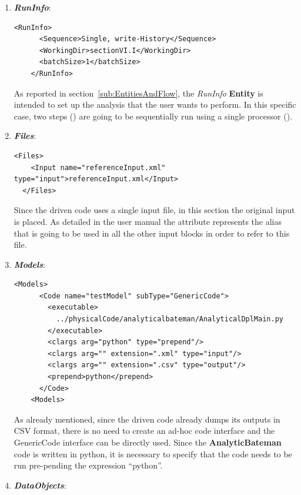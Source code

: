  \begin{enumerate}
   \item \textbf{\textit{RunInfo}}:
\begin{lstlisting}[style=XML,morekeywords={arg,extension,pauseAtEnd,overwrite}]
    <RunInfo>
      <Sequence>Single, write-History</Sequence>
      <WorkingDir>sectionVI.I</WorkingDir>
      <batchSize>1</batchSize>
    </RunInfo>   
\end{lstlisting}   
   As reported in section~\ref{sub:EntitiesAndFlow}, the \textit{RunInfo} \textbf{Entity} is intended to set up the analysis 
   that the user wants to perform. In this specific case, two steps () are going to be sequentially run 
   using a single processor ().
   
   \item \textbf{\textit{Files}}:
\begin{lstlisting}[style=XML,morekeywords={arg,extension,pauseAtEnd,overwrite}]
  <Files>
    <Input name="referenceInput.xml" type="input">referenceInput.xml</Input>
  </Files>
\end{lstlisting}
   Since the driven code uses a single input file, in this section the original input is placed. As detailed in the user manual
   the attribute   represents the alias that is going to be used in all the other input blocks in order to 
   refer to this file.
   \item \textbf{\textit{Models}}:
\begin{lstlisting}[style=XML,morekeywords={arg,extension,pauseAtEnd,overwrite}]
   <Models>
      <Code name="testModel" subType="GenericCode">
        <executable>
          ../physicalCode/analyticalbateman/AnalyticalDplMain.py
        </executable>
        <clargs arg="python" type="prepend"/>
        <clargs arg="" extension=".xml" type="input"/>
        <clargs arg="" extension=".csv" type="output"/>
        <prepend>python</prepend>
      </Code>
    <Models>
\end{lstlisting}
  As already mentioned, since the driven code already dumps its outputs in CSV format, there is no need to create
  an ad-hoc code interface and the GenericCode interface can be directly used. Since the \textbf{AnalyticBateman} code
  is written in python, it is necessary to specify that the code needs to be run pre-pending the expression ``python''. 
   \item \textbf{\textit{DataObjects}}:
\begin{lstlisting}[style=XML,morekeywords={arg,extension,pauseAtEnd,overwrite}]

\end{lstlisting}
\end{enumerate}
